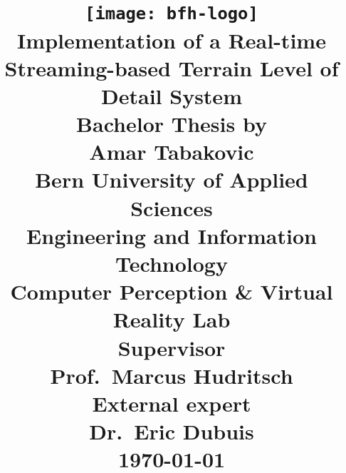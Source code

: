 \documentclass[10pt,a4paper]{report}
\begin{document}
\title{
\vspace{-80px}
\texttt{[image: bfh-logo]}\\
\vspace{80px}
\huge\textsf{\textbf{Implementation of a Real-time Streaming-based Terrain Level of Detail System}}\\
\vspace{40px}
\large{Bachelor Thesis
by\\}
\vspace{10px}
\Large{Amar Tabakovic\\}
\vspace{20px}
\large{
\textbf{Bern University of Applied Sciences}\\
  Engineering and Information Technology\\
  Computer Perception \& Virtual Reality Lab
\\
\vspace{15px}
\textbf{Supervisor}\\
Prof.~Marcus Hudritsch\\
\vspace{15px}
\textbf{External expert}\\
Dr.~Eric Dubuis}\\
\vspace{20px}
\today
}

\date{}
\maketitle
\end{document}
